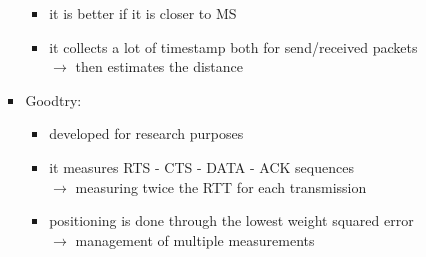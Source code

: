 \begin{itemize}
\begin{itemize}
\begin{itemize}
\begin{itemize}
                \item it is better if it is closer to MS
                \item it collects a lot of timestamp both for send/received packets\\
                $\rightarrow$ then estimates the distance 
            \end{itemize}
            \item Goodtry:
            \begin{itemize}
                \item developed for research purposes
                \item it measures RTS - CTS - DATA - ACK sequences\\[0.15cm]
                $\rightarrow$ measuring twice the RTT for each transmission
                \item positioning is done through the lowest weight squared error\\[0.15cm]
                $\rightarrow$ management of multiple measurements
            \end{itemize}
        \end{itemize}
    \end{itemize}
\end{itemize}
